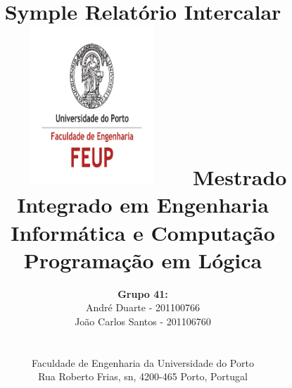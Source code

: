 \documentclass[a4paper]{article}
\begin{document}
\setlength{\textwidth}{16cm}
\setlength{\textheight}{22cm}

\title{\Huge\textbf{Symple}\linebreak\linebreak\linebreak
\Large\textbf{Relatório Intercalar}\linebreak\linebreak
\includegraphics[height=6cm, width=7cm]{feup.pdf}\linebreak \linebreak
\Large{Mestrado Integrado em Engenharia Informática e Computação} \linebreak \linebreak
\Large{Programação em Lógica}\linebreak
}

\author{\textbf{Grupo 41:}\\ André Duarte - 201100766 \\ João Carlos Santos - 201106760 \\\linebreak\linebreak \\
 \\ Faculdade de Engenharia da Universidade do Porto \\ Rua Roberto Frias, s\/n, 4200-465 Porto, Portugal \linebreak\linebreak\linebreak
\linebreak\linebreak\vspace{1cm}}
\maketitle
\thispagestyle{empty}

\end{document}
